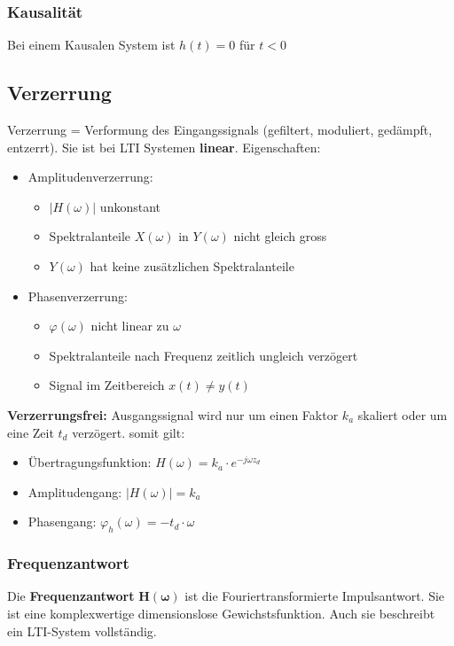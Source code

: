 \begin{multicols}{2}
    \subsubsection*{Kausalität}
    Bei einem Kausalen System ist $h(t) = 0$ für $t<0$

    \subsection*{Verzerrung}
    Verzerrung = Verformung des Eingangssignals (gefiltert, moduliert, gedämpft, entzerrt).
    Sie ist bei LTI Systemen \textbf{linear}.
    Eigenschaften:
    \begin{itemize}
        \item Amplitudenverzerrung:
              \begin{itemize}
                  \item $|H(\omega)|$ unkonstant
                  \item Spektralanteile $X(\omega)$ in $Y(\omega)$ nicht gleich gross
                  \item $Y(\omega)$ hat keine zusätzlichen Spektralanteile
              \end{itemize}
        \item Phasenverzerrung:
              \begin{itemize}
                  \item $\varphi(\omega)$ nicht linear zu $\omega$
                  \item Spektralanteile nach Frequenz zeitlich ungleich verzögert
                  \item Signal im Zeitbereich $x(t) \neq y(t)$
              \end{itemize}
    \end{itemize}
    \textbf{Verzerrungsfrei:} Ausgangssignal wird nur um einen Faktor $k_a$ skaliert
    oder um eine Zeit $t_d$ verzögert. somit gilt:
    \begin{itemize}
        \item Übertragungsfunktion: $H(\omega) = k_a \cdot e^{-j\omega z_d}$
        \item   Amplitudengang: $|H(\omega)| = k_a$
        \item  Phasengang: $\varphi_h(\omega) = -t_d \cdot \omega$
    \end{itemize}

    \subsubsection{Frequenzantwort}
    Die \textbf{Frequenzantwort} $\bm{H(\omega)}$ ist die Fouriertransformierte Impulsantwort.
    Sie ist eine komplexwertige dimensionslose Gewichstsfunktion.
    Auch sie beschreibt ein LTI-System vollständig.


\end{multicols}
